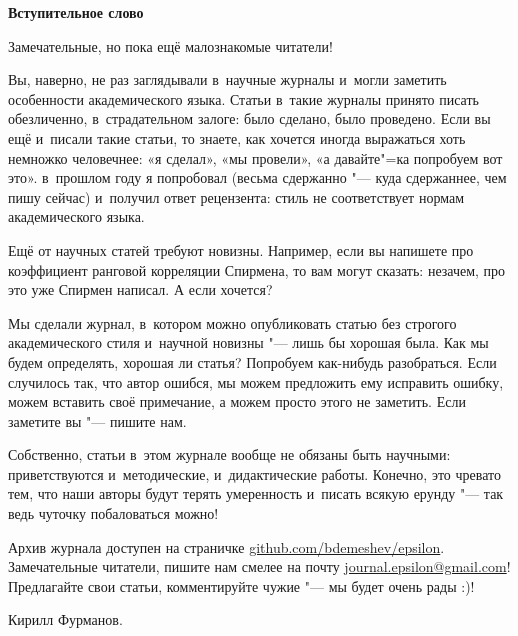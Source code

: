 \documentclass[11pt]{article}
\begin{document}
\pagestyle{empty}

\begin{center}
\Large\textbf{Вступительное слово}
\end{center}


Замечательные, но пока ещё малознакомые читатели!

Вы, наверно, не раз заглядывали в~научные журналы и~могли заметить особенности академического языка. Статьи в~такие журналы принято писать обезличенно, в~страдательном залоге: было сделано, было проведено. Если вы ещё и~писали такие статьи, то знаете, как хочется иногда выражаться хоть немножко человечнее: «я сделал», «мы провели», «а давайте"=ка попробуем вот это». в~прошлом году я попробовал (весьма сдержанно "--- куда сдержаннее, чем пишу сейчас) и~получил ответ рецензента: стиль не соответствует нормам академического языка.

Ещё от научных статей требуют новизны. Например, если вы напишете про коэффициент ранговой корреляции Спирмена, то вам могут сказать: незачем, про это уже Спирмен написал. А если хочется?

Мы сделали журнал, в~котором можно опубликовать статью без строгого академического стиля и~научной новизны "--- лишь бы хорошая была. Как мы будем определять, хорошая ли статья? Попробуем как-нибудь разобраться. Если случилось так, что автор ошибся, мы можем предложить ему исправить ошибку, можем вставить своё примечание, а можем просто этого не заметить. Если заметите вы "--- пишите нам.

Собственно, статьи в~этом журнале вообще не обязаны быть научными: приветствуются и~методические, и~дидактические работы. Конечно, это чревато тем, что наши авторы будут терять умеренность и~писать всякую ерунду "--- так ведь чуточку побаловаться можно!

Архив журнала доступен на страничке \href{http://bdemeshev.github.io/epsilon/}{github.com/bdemeshev/epsilon}. Замечательные читатели, пишите нам смелее на почту \href{mailto:journal.epsilon@gmail.com}{journal.epsilon@gmail.com}! Предлагайте свои статьи, комментируйте чужие "--- мы будет очень рады :)!


\begin{flushright}
Кирилл Фурманов.
\end{flushright}
\end{document}
